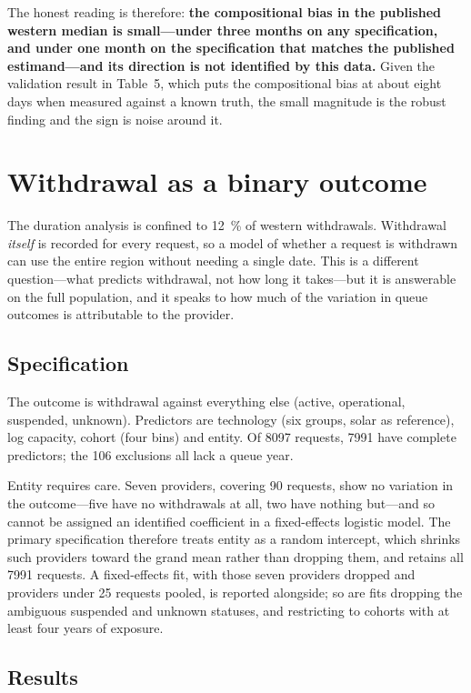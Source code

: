 \documentclass[11pt,a4paper]{article}
\begin{document}
The honest reading is therefore: \textbf{the compositional bias in the published
western median is small---under three months on any specification, and under one
month on the specification that matches the published estimand---and its
direction is not identified by this data.} Given the validation result in Table~5,
which puts the compositional bias at about eight days when measured against a
known truth, the small magnitude is the robust finding and the sign is noise
around it.

\section{Withdrawal as a binary outcome}

The duration analysis is confined to \SI{12}{\percent} of western withdrawals.
Withdrawal \emph{itself} is recorded for every request, so a model of whether a
request is withdrawn can use the entire region without needing a single date.
This is a different question---what predicts withdrawal, not how long it
takes---but it is answerable on the full population, and it speaks to how much of
the variation in queue outcomes is attributable to the provider.

\subsection{Specification}

The outcome is withdrawal against everything else (active, operational,
suspended, unknown). Predictors are technology (six groups, solar as reference),
log capacity, cohort (four bins) and entity. Of \num{8097} requests, \num{7991}
have complete predictors; the 106 exclusions all lack a queue year.

Entity requires care. Seven providers, covering 90 requests, show no variation in
the outcome---five have no withdrawals at all, two have nothing but---and so
cannot be assigned an identified coefficient in a fixed-effects logistic model.
The primary specification therefore treats entity as a random intercept, which
shrinks such providers toward the grand mean rather than dropping them, and
retains all \num{7991} requests. A fixed-effects fit, with those seven providers
dropped and providers under 25 requests pooled, is reported alongside; so are
fits dropping the ambiguous suspended and unknown statuses, and restricting to
cohorts with at least four years of exposure.

\subsection{Results}
\end{document}
